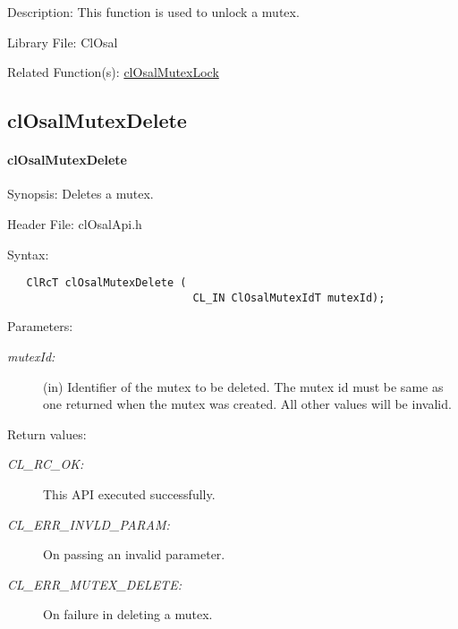 \begin{Desc}
\item[Description:]This function is used to unlock a mutex.\end{Desc}
\begin{Desc}
\item[Library File:]Cl\-Osal\end{Desc}
\begin{Desc}
\item[Related Function(s):]\hyperlink{pageosal100}{cl\-Osal\-Mutex\-Lock} \end{Desc}

\newpage
\subsection{clOsalMutexDelete}
\hypertarget{pageosal155}{}\paragraph{cl\-Osal\-Mutex\-Delete}\label{pageosal155}
\begin{Desc}
\item[Synopsis:]Deletes a mutex.\end{Desc}
\begin{Desc}
\item[Header File:]clOsalApi.h\end{Desc}
\begin{Desc}
\item[Syntax:]

\footnotesize\begin{verbatim}   ClRcT clOsalMutexDelete (
                             CL_IN ClOsalMutexIdT mutexId);
\end{verbatim}
\normalsize
\end{Desc}
\begin{Desc}
\item[Parameters:]
\begin{description}
\item[{\em mutex\-Id:}](in) Identifier of the mutex to be deleted. The mutex id must be same as one returned when the mutex was created. All other values will be invalid.\end{description}
\end{Desc}
\begin{Desc}
\item[Return values:]
\begin{description}
\item[{\em CL\_\-RC\_\-OK:}]This API executed successfully. \item[{\em CL\_\-ERR\_\-INVLD\_\-PARAM:}]On passing an invalid parameter. \item[{\em CL\_\-ERR\_\-MUTEX\_\-DELETE:}]On failure in deleting a mutex.\end{description}
\end{Desc}
